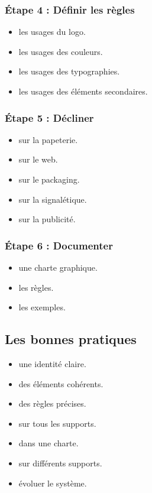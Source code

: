\subsubsection{Étape 4 : Définir les règles}

\begin{itemize}
    \item {} les usages du logo.
    \item {} les usages des couleurs.
    \item {} les usages des typographies.
    \item {} les usages des éléments secondaires.
\end{itemize}

\subsubsection{Étape 5 : Décliner}

\begin{itemize}
    \item {} sur la papeterie.
    \item {} sur le web.
    \item {} sur le packaging.
    \item {} sur la signalétique.
    \item {} sur la publicité.
\end{itemize}

\subsubsection{Étape 6 : Documenter}

\begin{itemize}
    \item {} une charte graphique.
    \item {} les règles.
    \item {} les exemples.
\end{itemize}

\subsection{Les bonnes pratiques}

\begin{itemize}
    \item {} une identité claire.
    \item {} des éléments cohérents.
    \item {} des règles précises.
    \item {} sur tous les supports.
    \item {} dans une charte.
    \item {} sur différents supports.
    \item {} évoluer le système.
\end{itemize}

